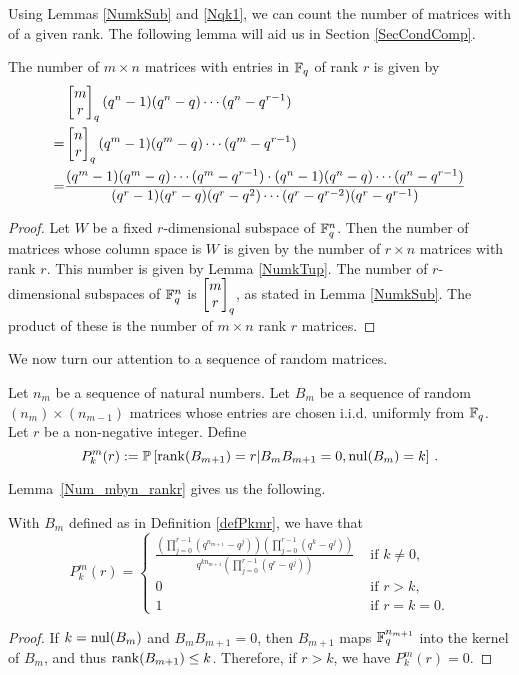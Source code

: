 Using Lemmas \ref{NumkSub} and \ref{Nqk1}, we can count the number of matrices with of a given rank. The following lemma will aid us in Section \ref{SecCondComp}.

\begin{lemma}\label{Num_mbyn_rankr}
The number of $m\times n$ matrices with entries in $\mathbb{F}_q$ of rank $r$ is given by
\begin{align*}
	&\begin{bmatrix}{m}\\ {r}\end{bmatrix}_q(q^n-1)(q^n-q)\cdots (q^n-q^{r-1})\\
   =& \begin{bmatrix}{n}\\ {r}\end{bmatrix}_q(q^m-1)(q^m-q)\cdots (q^m-q^{r-1})\\
   =& \frac{(q^m-1) (q^m-q) \cdots (q^m-q^{r-1})\cdot
            (q^n-1) (q^n-q) \cdots (q^n-q^{r-1})}
	 		      {(q^r-1)(q^r - q)(q^r - q^2)\cdots (q^r - q^{r-2})(q^r-q^{r-1})}
\end{align*}
\end{lemma}

\begin{proof}
  Let $W$ be a fixed $r$-dimensional subspace of $\mathbb{F}_q^{n}$.  Then the number of matrices whose column space is $W$ is given by the number of $r\times n$ matrices with rank $r$.  This number is given by Lemma \ref{NumkTup}. The number of $r$-dimensional subspaces of $\mathbb{F}_q^{n}$ is $\begin{bmatrix}{m}\\ {r}\end{bmatrix}_q$, as stated in Lemma \ref{NumkSub}.  The product of these is the number of $m\times n$ rank $r$ matrices.
\end{proof}

We now turn our attention to a sequence of random matrices.

\begin{definition}\label{defPkmr}
Let $n_m$ be a sequence of natural numbers. Let $B_m$ be a sequence of random $(n_m) \times (n_{m-1})$ matrices whose entries are chosen i.i.d. uniformly from $\mathbb{F}_q$. Let $r$ be a non-negative integer.  Define 
\[
  P^m_k(r) := \mathbb{P} 
  \left[\operatorname{\mathrm{rank}}(B_{m+1}) = r|B_{m}B_{m+1} = 0, \mathrm{nul}(B_{m}) = k \right] \, .
\]
\end{definition}


Lemma~\ref{Num_mbyn_rankr} gives us the following.

\begin{lemma} With $B_m$ defined as in Definition \ref{defPkmr}, we have that
\[
P^m_k(r) = \begin{cases}
  {\displaystyle \frac{\left(\prod_{j=0}^{r-1}\left(q^{n_{m+1}}-q^{j}\right)\right)
  \left(\prod_{j=0}^{r-1}\left(q^k - q^j \right) \right)}
  {q^{kn_{m+1}} \left(\prod_{j=0}^{r-1} \left(q^r-q^j\right)\right)}}
            					& \textrm{ if } k\neq 0,\\
           0					& \textrm{ if }  r>k,\\
           1					& \textrm{ if } r = k = 0.
            \end{cases}
\]
\end{lemma}
\begin{proof}
If $k= \mathrm{nul}(B_{m})$ and $B_mB_{m+1} = 0$, then $B_{m+1}$ maps $\mathbb{F}_q^{n_{m+1}}$ into the kernel of $B_m$, and thus $\operatorname{\mathrm{rank}}(B_{m+1}) \leq k$.  Therefore, if $r>k$, we have $P^m_k(r) = 0$.
\end{proof}